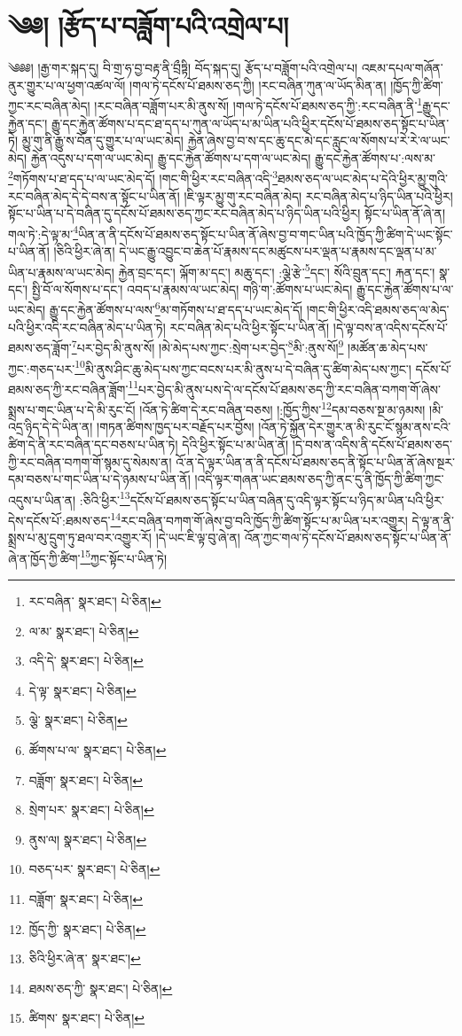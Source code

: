 \setcounter{footnote}{0} 
\chapter{༄༅། །རྩོད་པ་བཟློག་པའི་འགྲེལ་པ།}༄༅༅། །རྒྱ་གར་སྐད་དུ། བི་གྲ་ཧ་བྱ་བརྟ་ནི་བྲྀཏྟི། བོད་སྐད་དུ། རྩོད་པ་བཟློག་པའི་འགྲེལ་པ། འཇམ་དཔལ་གཞོན་ནུར་གྱུར་པ་ལ་ཕྱག་འཚལ་ལོ། །གལ་ཏེ་དངོས་པོ་ཐམས་ཅད་ཀྱི། །རང་བཞིན་ཀུན་ལ་ཡོད་མིན་ན། །ཁྱོད་ཀྱི་ཚིག་ཀྱང་རང་བཞིན་མེད། །རང་བཞིན་བཟློག་པར་མི་ནུས་སོ། །གལ་ཏེ་དངོས་པོ་ཐམས་ཅད་ཀྱི་:རང་བཞིན་ནི་\footnote{རང་བཞིན་  སྣར་ཐང་།  པེ་ཅིན། }རྒྱུ་དང་རྐྱེན་དང་། རྒྱུ་དང་རྐྱེན་ཚོགས་པ་དང་ཐ་དད་པ་ཀུན་ལ་ཡོད་པ་མ་ཡིན་པའི་ཕྱིར་དངོས་པོ་ཐམས་ཅད་སྟོང་པ་ཡིན་ཏེ། མྱུ་གུ་ནི་རྒྱུ་ས་བོན་དུ་གྱུར་པ་ལ་ཡང་མེད། རྐྱེན་ཞེས་བྱ་བ་ས་དང་ཆུ་དང་མེ་དང་རླུང་ལ་སོགས་པ་རེ་རེ་ལ་ཡང་མེད། རྐྱེན་འདུས་པ་དག་ལ་ཡང་མེད། རྒྱུ་དང་རྐྱེན་ཚོགས་པ་དག་ལ་ཡང་མེད། རྒྱུ་དང་རྐྱེན་ཚོགས་པ་:ལས་མ་\footnote{ལ་མ་  སྣར་ཐང་།  པེ་ཅིན། }གཏོགས་པ་ཐ་དད་པ་ལ་ཡང་མེད་དོ། །གང་གི་ཕྱིར་རང་བཞིན་འདི་\footnote{འདི་དེ་  སྣར་ཐང་།  པེ་ཅིན། }ཐམས་ཅད་ལ་ཡང་མེད་པ་དེའི་ཕྱིར་མྱུ་གུའི་རང་བཞིན་མེད་དེ་དེ་བས་ན་སྟོང་པ་ཡིན་ནོ། །ཇི་ལྟར་མྱུ་གུ་རང་བཞིན་མེད། རང་བཞིན་མེད་པ་ཉིད་ཡིན་པའི་ཕྱིར། སྟོང་པ་ཡིན་པ་དེ་བཞིན་དུ་དངོས་པོ་ཐམས་ཅད་ཀྱང་རང་བཞིན་མེད་པ་ཉིད་ཡིན་པའི་ཕྱིར། སྟོང་པ་ཡིན་ནོ་ཞེ་ན། གལ་ཏེ་:དེ་ལྟ་མ་\footnote{དེ་ལྟ་  སྣར་ཐང་།  པེ་ཅིན། }ཡིན་ན་ནི་དངོས་པོ་ཐམས་ཅད་སྟོང་པ་ཡིན་ནོ་ཞེས་བྱ་བ་གང་ཡིན་པའི་ཁྱོད་ཀྱི་ཚིག་དེ་ཡང་སྟོང་པ་ཡིན་ནོ། །ཅིའི་ཕྱིར་ཞེ་ན། དེ་ཡང་རྒྱུ་འབྱུང་བ་ཆེན་པོ་རྣམས་དང་མཚུངས་པར་ལྡན་པ་རྣམས་དང་ལྡན་པ་མ་ཡིན་པ་རྣམས་ལ་ཡང་མེད། རྐྱེན་བྲང་དང་། ལྐོག་མ་དང་། མཆུ་དང་། :ལྕེ་རྩེ་\footnote{ལྕེ་  སྣར་ཐང་།  པེ་ཅིན། }དང་། སོའི་བྲུན་དང་། རྐན་དང་། སྣ་དང་། སྤྱི་བོ་ལ་སོགས་པ་དང་། འབད་པ་རྣམས་ལ་ཡང་མེད། གཉི་ག་:ཚོགས་པ་ཡང་མེད། རྒྱུ་དང་རྐྱེན་ཚོགས་པ་ལ་ཡང་མེད། རྒྱུ་དང་རྐྱེན་ཚོགས་པ་ལས་\footnote{ཚོགས་པ་ལ་  སྣར་ཐང་།  པེ་ཅིན། }མ་གཏོགས་པ་ཐ་དད་པ་ཡང་མེད་དོ། །གང་གི་ཕྱིར་འདི་ཐམས་ཅད་ལ་མེད་པའི་ཕྱིར་འདི་རང་བཞིན་མེད་པ་ཡིན་ཏེ། རང་བཞིན་མེད་པའི་ཕྱིར་སྟོང་པ་ཡིན་ནོ། །དེ་ལྟ་བས་ན་འདིས་དངོས་པོ་ཐམས་ཅད་ཟློག་\footnote{བཟློག་  སྣར་ཐང་།  པེ་ཅིན། }པར་བྱེད་མི་ནུས་སོ། །མེ་མེད་པས་ཀྱང་:སྲེག་པར་བྱེད་\footnote{སྲེག་པར་  སྣར་ཐང་།  པེ་ཅིན། }མི་:ནུས་སོ།\footnote{ནུས་ལ།  སྣར་ཐང་།  པེ་ཅིན། } །མཚོན་ཆ་མེད་པས་ཀྱང་:གཅད་པར་\footnote{བཅད་པར་  སྣར་ཐང་།  པེ་ཅིན། }མི་ནུས་ཤིང་ཆུ་མེད་པས་ཀྱང་བངས་པར་མི་ནུས་པ་དེ་བཞིན་དུ་ཚིག་མེད་པས་ཀྱང་། དངོས་པོ་ཐམས་ཅད་ཀྱི་རང་བཞིན་ཟློག་\footnote{བཟློག་  སྣར་ཐང་།  པེ་ཅིན། }པར་བྱེད་མི་ནུས་པས་དེ་ལ་དངོས་པོ་ཐམས་ཅད་ཀྱི་རང་བཞིན་བཀག་གོ་ཞེས་སྨྲས་པ་གང་ཡིན་པ་དེ་མི་རུང་ངོ། །འོན་ཏེ་ཚིག་དེ་རང་བཞིན་བཅས། །:ཁྱོད་ཀྱིས་\footnote{ཁྱོད་ཀྱི་  སྣར་ཐང་།  པེ་ཅིན། }དམ་བཅས་སྔ་མ་ཉམས། །མི་འདྲ་ཉིད་དེ་དེ་ཡིན་ན། །གཏན་ཚིགས་ཁྱད་པར་བརྗོད་པར་བྱོས། །འོན་ཏེ་སྐྱོན་དེར་གྱུར་ན་མི་རུང་ངོ་སྙམ་ནས་ངའི་ཚིག་དེ་ནི་རང་བཞིན་དང་བཅས་པ་ཡིན་ཏེ། དེའི་ཕྱིར་སྟོང་པ་མ་ཡིན་ནོ། །དེ་བས་ན་འདིས་ནི་དངོས་པོ་ཐམས་ཅད་ཀྱི་རང་བཞིན་བཀག་གོ་སྙམ་དུ་སེམས་ན། འོ་ན་དེ་ལྟར་ཡིན་ན་ནི་དངོས་པོ་ཐམས་ཅད་ནི་སྟོང་པ་ཡིན་ནོ་ཞེས་སྔར་དམ་བཅས་པ་གང་ཡིན་པ་དེ་ཉམས་པ་ཡིན་ནོ། །འདི་ལྟར་གཞན་ཡང་ཐམས་ཅད་ཀྱི་ནང་དུ་ནི་ཁྱོད་ཀྱི་ཚིག་ཀྱང་འདུས་པ་ཡིན་ན། :ཅིའི་ཕྱིར་\footnote{ཅིའི་ཕྱིར་ཞེ་ན་  སྣར་ཐང་། }དངོས་པོ་ཐམས་ཅད་སྟོང་པ་ཡིན་བཞིན་དུ་འདི་ལྟར་སྟོང་པ་ཉིད་མ་ཡིན་པའི་ཕྱིར་དེས་དངོས་པོ་:ཐམས་ཅད་\footnote{ཐམས་ཅད་ཀྱི་  སྣར་ཐང་།  པེ་ཅིན། }རང་བཞིན་བཀག་གོ་ཞེས་བྱ་བའི་ཁྱོད་ཀྱི་ཚིག་སྟོང་པ་མ་ཡིན་པར་འགྱུར། དེ་ལྟ་ན་ནི་སྨྲས་པ་མུ་དྲུག་ཏུ་ཐལ་བར་འགྱུར་རོ། །དེ་ཡང་ཇི་ལྟ་བུ་ཞེ་ན། འོན་ཀྱང་གལ་ཏེ་དངོས་པོ་ཐམས་ཅད་སྟོང་པ་ཡིན་ནོ་ཞེ་ན་ཁྱོད་ཀྱི་ཚིག་\footnote{ཚིགས་  སྣར་ཐང་།  པེ་ཅིན། }ཀྱང་སྟོང་པ་ཡིན་ཏེ། 